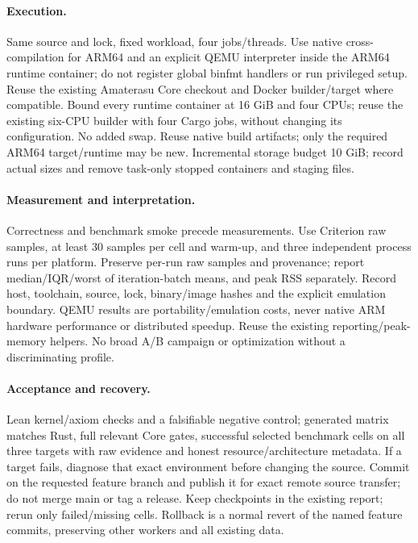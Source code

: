 \documentclass[11pt,a4paper]{article}
\begin{document}
\paragraph{Execution.}
Same source and lock, fixed workload, four jobs/threads. Use native cross-compilation
for ARM64 and an explicit QEMU interpreter inside the ARM64 runtime container;
do not register global binfmt handlers or run privileged setup. Reuse the existing
Amaterasu Core checkout and Docker builder/target where compatible. Bound every
runtime container at 16 GiB and four CPUs; reuse the existing six-CPU
builder with four Cargo jobs, without changing its configuration. No added swap. Reuse native build artifacts;
only the required ARM64 target/runtime may be new. Incremental storage budget 10 GiB;
record actual sizes and remove task-only stopped containers and staging files.

\paragraph{Measurement and interpretation.}
Correctness and benchmark smoke precede measurements. Use Criterion raw samples,
at least 30 samples per cell and warm-up, and three independent process runs per
platform. Preserve per-run raw samples and provenance; report median/IQR/worst of
iteration-batch means, and peak RSS separately. Record host, toolchain, source,
lock, binary/image hashes and the explicit emulation boundary. QEMU results are
portability/emulation costs, never native ARM hardware performance or distributed
speedup. Reuse the existing reporting/peak-memory helpers. No broad A/B campaign
or optimization without a discriminating profile.

\paragraph{Acceptance and recovery.}
Lean kernel/axiom checks and a falsifiable negative control; generated matrix
matches Rust, full relevant Core gates, successful selected benchmark cells on
all three targets with raw evidence and honest resource/architecture metadata.
If a target fails, diagnose that exact environment before changing the source.
Commit on the requested feature branch and publish it for exact remote source
transfer; do not merge main or tag a release. Keep checkpoints in the existing
report; rerun only failed/missing cells. Rollback is a normal revert of the named
feature commits, preserving other workers and all existing data.
\end{document}

